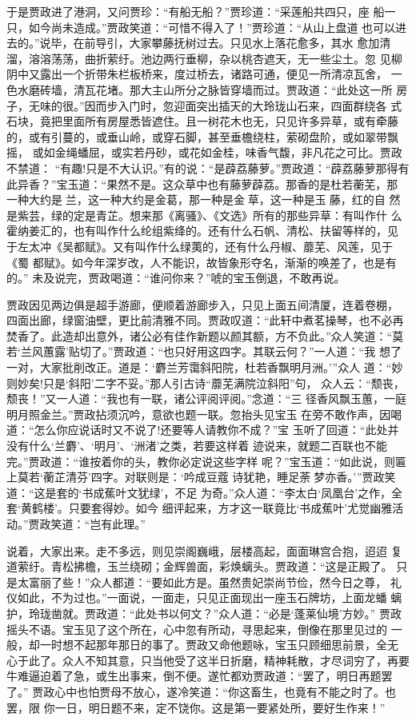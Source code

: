 于是贾政进了港洞，又问贾珍：“有船无船？”贾珍道：“采莲船共四只，座
船一只，如今尚未造成。”贾政笑道：“可惜不得入了！”贾珍道：“从山上盘道
也可以进去的。”说毕，在前导引，大家攀藤抚树过去。只见水上落花愈多，其水
愈加清溜，溶溶荡荡，曲折萦纡。池边两行垂柳，杂以桃杏遮天，无一些尘土。忽
见柳阴中又露出一个折带朱栏板桥来，度过桥去，诸路可通，便见一所清凉瓦舍，
一色水磨砖墙，清瓦花堵。那大主山所分之脉皆穿墙而过。贾政道：“此处这一所
房子，无味的很。”因而步入门时，忽迎面突出插天的大玲珑山石来，四面群绕各
式石块，竟把里面所有房屋悉皆遮住。且一树花木也无，只见许多异草，或有牵藤
的，或有引蔓的，或垂山岭，或穿石脚，甚至垂檐绕柱，萦砌盘阶，或如翠带飘摇，
或如金绳蟠屈，或实若丹砂，或花如金桂，味香气馥，非凡花之可比。贾政不禁道：
“有趣!只是不大认识。”有的说：“是薜荔藤萝。”贾政道：“薜荔藤萝那得有
此异香？”宝玉道：“果然不是。这众草中也有藤萝薜荔。那香的是杜若蘅芜，那
一种大约是兰，这一种大约是金葛，那一种是金草，这一种是玉藤，红的自
然是紫芸，绿的定是青芷。想来那《离骚》、《文选》所有的那些异草：有叫作什
么霍纳姜汇的，也有叫作什么纶组紫绛的。还有什么石帆、清松、扶留等样的，见
于左太冲《吴都赋》。又有叫作什么绿荑的，还有什么丹椒、蘼芜、风莲，见于《蜀
都赋》。如今年深岁改，人不能识，故皆象形夺名，渐渐的唤差了，也是有的。”
未及说完，贾政喝道：“谁问你来？”唬的宝玉倒退，不敢再说。

贾政因见两边俱是超手游廊，便顺着游廊步入，只见上面五间清厦，连着卷棚，
四面出廊，绿窗油壁，更比前清雅不同。贾政叹道：“此轩中煮茗操琴，也不必再
焚香了。此造却出意外，诸公必有佳作新题以颜其额，方不负此。”众人笑道：“莫
若‘兰风蕙露’贴切了。”贾政道：“也只好用这四字。其联云何？”一人道：“我
想了一对，大家批削改正。道是：‘麝兰芳霭斜阳院，杜若香飘明月洲。’”众人
道：“妙则妙矣!只是‘斜阳’二字不妥。”那人引古诗“蘼芜满院泣斜阳”句，
众人云：“颓丧，颓丧！”又一人道：“我也有一联，诸公评阅评阅。”念道：“三
径香风飘玉蕙，一庭明月照金兰。”贾政拈须沉吟，意欲也题一联。忽抬头见宝玉
在旁不敢作声，因喝道：“怎么你应说话时又不说了!还要等人请教你不成？”宝
玉听了回道：“此处并没有什么‘兰麝’、‘明月’、‘洲渚’之类，若要这样着
迹说来，就题二百联也不能完。”贾政道：“谁按着你的头，教你必定说这些字样
呢？”宝玉道：“如此说，则匾上莫若‘蘅芷清芬’四字。对联则是：‘吟成豆蔻
诗犹艳，睡足荼梦亦香。’”贾政笑道：“这是套的‘书成蕉叶文犹绿’，不足
为奇。”众人道：“李太白‘凤凰台’之作，全套‘黄鹤楼’。只要套得妙。如今
细评起来，方才这一联竟比‘书成蕉叶’尤觉幽雅活动。”贾政笑道：“岂有此理。”

说着，大家出来。走不多远，则见崇阁巍峨，层楼高起，面面琳宫合抱，迢迢
复道萦纡。青松拂檐，玉兰绕砌；金辉兽面，彩焕螭头。贾政道：“这是正殿了。
只是太富丽了些！”众人都道：“要如此方是。虽然贵妃崇尚节俭，然今日之尊，
礼仪如此，不为过也。”一面说，一面走，只见正面现出一座玉石牌坊，上面龙蟠
螭护，玲珑凿就。贾政道：“此处书以何文？”众人道：“必是‘蓬莱仙境’方妙。”
贾政摇头不语。宝玉见了这个所在，心中忽有所动，寻思起来，倒像在那里见过的
一般，却一时想不起那年那日的事了。贾政又命他题咏，宝玉只顾细思前景，全无
心于此了。众人不知其意，只当他受了这半日折磨，精神耗散，才尽词穷了，再要
牛难逼迫着了急，或生出事来，倒不便。遂忙都劝贾政道：“罢了，明日再题罢了。”
贾政心中也怕贾母不放心，遂冷笑道：“你这畜生，也竟有不能之时了。也罢，限
你一日，明日题不来，定不饶你。这是第一要紧处所，要好生作来！”

